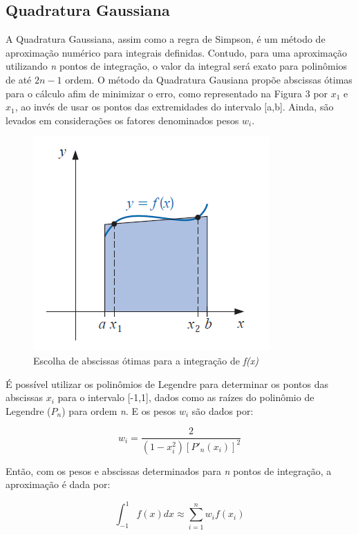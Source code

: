\documentclass[12pt,a4paper]{article}
\begin{document}
\newpage
\subsection{Quadratura Gaussiana}

\qquad A Quadratura Gaussiana, assim como a regra de Simpson, é um método de aproximação numérico para integrais definidas. Contudo, para uma aproximação utilizando \textit{n} pontos de integração, o valor da integral será exato para polinômios de até $2\textit{n}-1$ ordem. O método da Quadratura Gausiana propõe abscissas ótimas para o cálculo afim de minimizar o erro, como representado na Figura 3 por $x_{1}$ e $x_{1}$, ao invés de usar os pontos das extremidades do intervalo [a,b]. Ainda, são levados em considerações os fatores denominados pesos $w_{i}$. 

\begin{figure}[h]
\includegraphics{images/gaussapproximation}
\caption{Escolha de abscissas ótimas para a integração de \textit{f(x)}}
\end{figure}

\qquad É possível utilizar os polinômios de Legendre para determinar os pontos das abscissas $x_{i}$ para o intervalo [-1,1], dados como as raízes do polinômio de Legendre (\textit{$P_{n}$}) para ordem \textit{n}. E os pesos $w_{i}$ são dados por:

\begin{equation}
w_{i}=\dfrac{2}{(1-x^2_{i})[P'_{n}(x_{i})]^2}
\end{equation}

\qquad Então, com os pesos e abscissas determinados para \textit{n} pontos de integração, a aproximação é dada por:

\begin{equation}
\int_{-1}^{1} f(x)dx \approx \sum_{i=1}^{n} w_{i}f(x_{i})
\end{equation}
\end{document}
